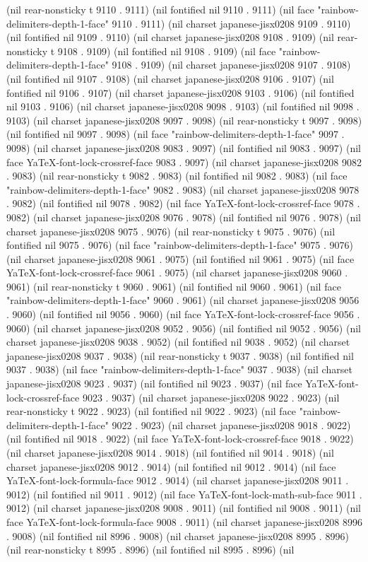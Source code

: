(nil rear-nonsticky t 9110 . 9111) (nil fontified nil 9110 . 9111) (nil face "rainbow-delimiters-depth-1-face" 9110 . 9111) (nil charset japanese-jisx0208 9109 . 9110) (nil fontified nil 9109 . 9110) (nil charset japanese-jisx0208 9108 . 9109) (nil rear-nonsticky t 9108 . 9109) (nil fontified nil 9108 . 9109) (nil face "rainbow-delimiters-depth-1-face" 9108 . 9109) (nil charset japanese-jisx0208 9107 . 9108) (nil fontified nil 9107 . 9108) (nil charset japanese-jisx0208 9106 . 9107) (nil fontified nil 9106 . 9107) (nil charset japanese-jisx0208 9103 . 9106) (nil fontified nil 9103 . 9106) (nil charset japanese-jisx0208 9098 . 9103) (nil fontified nil 9098 . 9103) (nil charset japanese-jisx0208 9097 . 9098) (nil rear-nonsticky t 9097 . 9098) (nil fontified nil 9097 . 9098) (nil face "rainbow-delimiters-depth-1-face" 9097 . 9098) (nil charset japanese-jisx0208 9083 . 9097) (nil fontified nil 9083 . 9097) (nil face YaTeX-font-lock-crossref-face 9083 . 9097) (nil charset japanese-jisx0208 9082 . 9083) (nil rear-nonsticky t 9082 . 9083) (nil fontified nil 9082 . 9083) (nil face "rainbow-delimiters-depth-1-face" 9082 . 9083) (nil charset japanese-jisx0208 9078 . 9082) (nil fontified nil 9078 . 9082) (nil face YaTeX-font-lock-crossref-face 9078 . 9082) (nil charset japanese-jisx0208 9076 . 9078) (nil fontified nil 9076 . 9078) (nil charset japanese-jisx0208 9075 . 9076) (nil rear-nonsticky t 9075 . 9076) (nil fontified nil 9075 . 9076) (nil face "rainbow-delimiters-depth-1-face" 9075 . 9076) (nil charset japanese-jisx0208 9061 . 9075) (nil fontified nil 9061 . 9075) (nil face YaTeX-font-lock-crossref-face 9061 . 9075) (nil charset japanese-jisx0208 9060 . 9061) (nil rear-nonsticky t 9060 . 9061) (nil fontified nil 9060 . 9061) (nil face "rainbow-delimiters-depth-1-face" 9060 . 9061) (nil charset japanese-jisx0208 9056 . 9060) (nil fontified nil 9056 . 9060) (nil face YaTeX-font-lock-crossref-face 9056 . 9060) (nil charset japanese-jisx0208 9052 . 9056) (nil fontified nil 9052 . 9056) (nil charset japanese-jisx0208 9038 . 9052) (nil fontified nil 9038 . 9052) (nil charset japanese-jisx0208 9037 . 9038) (nil rear-nonsticky t 9037 . 9038) (nil fontified nil 9037 . 9038) (nil face "rainbow-delimiters-depth-1-face" 9037 . 9038) (nil charset japanese-jisx0208 9023 . 9037) (nil fontified nil 9023 . 9037) (nil face YaTeX-font-lock-crossref-face 9023 . 9037) (nil charset japanese-jisx0208 9022 . 9023) (nil rear-nonsticky t 9022 . 9023) (nil fontified nil 9022 . 9023) (nil face "rainbow-delimiters-depth-1-face" 9022 . 9023) (nil charset japanese-jisx0208 9018 . 9022) (nil fontified nil 9018 . 9022) (nil face YaTeX-font-lock-crossref-face 9018 . 9022) (nil charset japanese-jisx0208 9014 . 9018) (nil fontified nil 9014 . 9018) (nil charset japanese-jisx0208 9012 . 9014) (nil fontified nil 9012 . 9014) (nil face YaTeX-font-lock-formula-face 9012 . 9014) (nil charset japanese-jisx0208 9011 . 9012) (nil fontified nil 9011 . 9012) (nil face YaTeX-font-lock-math-sub-face 9011 . 9012) (nil charset japanese-jisx0208 9008 . 9011) (nil fontified nil 9008 . 9011) (nil face YaTeX-font-lock-formula-face 9008 . 9011) (nil charset japanese-jisx0208 8996 . 9008) (nil fontified nil 8996 . 9008) (nil charset japanese-jisx0208 8995 . 8996) (nil rear-nonsticky t 8995 . 8996) (nil fontified nil 8995 . 8996) (nil 